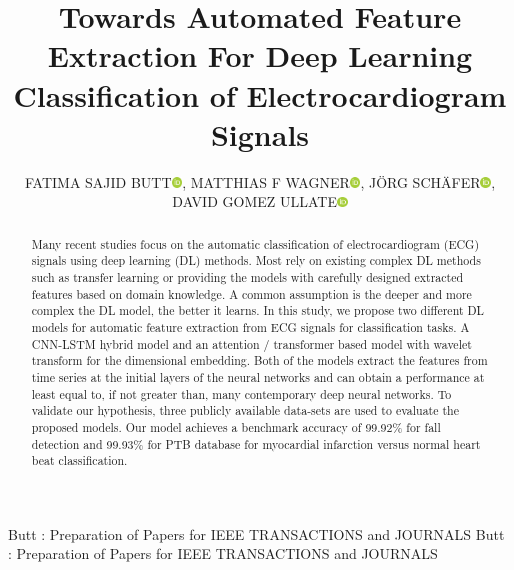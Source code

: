 \documentclass{ieeeaccess}
\newcommand{\orcid}[1]{\href{https://orcid.org/#1}{\includegraphics[width=8pt]{Definitions/preview.png}}}
\begin{document}

\title{Towards Automated Feature Extraction For Deep Learning Classification of Electrocardiogram Signals}
\author{\uppercase{Fatima Sajid Butt}\orcid{0000-0002-9111-7305},
\uppercase{Matthias F Wagner}\orcid{0000-0002-8702-9257},
\uppercase{Jörg Schäfer}\orcid{0000-0003-4797-0306},
\uppercase{David Gomez Ullate}\orcid{0000-0002-6890-6584}}
\address[1]{Frankfurt University of Applied Sciences, Nibelungenpl. 1, 60318 Frankfurt am Main, Germany (e-mail: fbutt@fb2.fra-uas.de)}
\address[2]{Escuela Superior de Ingeniería, Universidad de Cádiz, 11001 Cádiz, Spain (e-mail: fatima.sajidbutt@alum.uca.es)}
\address[3]{Frankfurt University of Applied Sciences, Nibelungenpl. 1, 60318 Frankfurt am Main, Germany (e-mail: jschaefer@fb2.fra-uas.de9}
\address[4]{Frankfurt University of Applied Sciences, Nibelungenpl. 1, 60318 Frankfurt am Main, Germany (e-mail: mfwagner@fb2.fra-uas.de)}
\address[5]{Escuela Superior de Ingeniería, Universidad de Cádiz, 11001 Cádiz, Spain (e-mail: david.gomezullate@uca.es)}


\markboth
{Butt \headeretal: Preparation of Papers for IEEE TRANSACTIONS and JOURNALS}
{Butt \headeretal: Preparation of Papers for IEEE TRANSACTIONS and JOURNALS}


\begin{abstract}
Many recent studies focus on the automatic classification of electrocardiogram (ECG) signals using deep learning (DL) methods. Most rely on existing complex DL methods such as transfer learning or providing the models with carefully designed extracted features based on domain knowledge. A common assumption is the deeper and more complex the DL model, the better it learns. In this study, we propose two different DL models for automatic feature extraction from ECG signals for classification tasks. A CNN-LSTM hybrid model and an attention / transformer based model with wavelet transform for the dimensional embedding. Both of the models extract the features from time series at the initial layers of the neural networks and can obtain a performance at least equal to, if not greater than, many contemporary deep neural networks. To validate our hypothesis, three publicly available data-sets are used to evaluate the proposed models. Our model achieves a benchmark accuracy of 99.92\% for fall detection and 99.93\% for PTB database for myocardial infarction versus normal heart beat classification.
\end{abstract}
\end{document}
